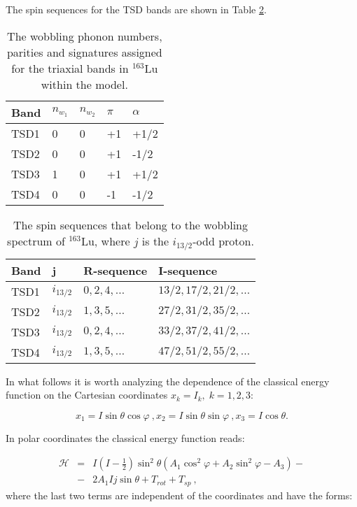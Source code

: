 \documentclass[twocolumn,article,amsmath,amssymb,floatfix,aps]{revtex4}
\begin{document}
 The spin sequences for the TSD bands are shown in Table \ref{spin_sequences}. 

\begin{table}[h]
    \centering
  \begin{tabular}{lllll}
  \hline
Band & $n_{w_1}$ & $n_{w_2}$ &  $\pi$ &  $\alpha$ \\
\hline
\hline
TSD1 &     0      &       0    &    +1  &    +1/2  \\
TSD2 &    0       &       0    &    +1  &    -1/2  \\
TSD3 &     1      &     0      &    +1  &    +1/2  \\
TSD4 &     0      &     0      &     -1  &    -1/2  \\
\hline
\end{tabular}
    \caption{The wobbling phonon numbers, parities and signatures assigned for the triaxial bands in $^{163}$Lu  within the model. }
    \label{tabular_phonon_numbers}
\end{table}

\begin{table}[h]
    \centering
  \begin{tabular}{llll}
  \hline
Band & j & $\mathbf{R}$-sequence & $\mathbf{I}$-sequence \\
\hline
\hline
TSD1 & $i_{13/2}$  &   $0,2,4,\dots$         &   $13/2,17/2,21/2,\dots$         \\
TSD2 & $i_{13/2}$  &   $1,3,5,\dots$         &           $27/2,31/2,35/2,\dots$ \\
TSD3 & $i_{13/2}$  &  $0,2,4,\dots$ & $33/2,37/2,41/2,\dots$     \\
TSD4 & $i_{13/2}$  &         $1,3,5,\dots$   &       $47/2,51/2,55/2,\dots$    
\end{tabular}
    \caption{The spin sequences that belong to the wobbling spectrum of $^{163}$Lu, where $j$ is the $i_{13/2}$-odd proton.  }
    \label{spin_sequences}
\end{table}

In what follows it is worth  analyzing  the dependence of the classical energy function on the Cartesian coordinates $x_k=I_k,\;k=1,2,3$:

\begin{equation}
    x_1=I\sin\theta \cos\varphi\ ,
    x_2=I\sin\theta \sin\varphi\ ,
    x_3=I\cos\theta. 
\end{equation}

In polar coordinates the classical energy function reads:

\begin{eqnarray}
    \mathcal{H}&=&I\left(I-\frac{1}{2}\right)\sin^2\theta\left(A_1\cos^2\varphi+A_2\sin^2\varphi-A_3\right)-\nonumber\\
    &-&2A_1Ij\sin\theta+T_{rot}+T_{sp}\ , \label{energy_function}
\end{eqnarray}
\noindent
where the last two terms are independent of the coordinates and have the forms:
\end{document}

